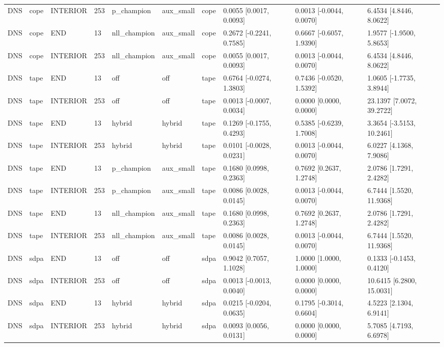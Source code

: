 \begin{tabular}{llllllllll}
DNS & cope & INTERIOR & 253 & p\_champion & aux\_small & cope & 0.0055 [0.0017, 0.0093] & 0.0013 [-0.0044, 0.0070] & 6.4534 [4.8446, 8.0622] \\
DNS & cope & END & 13 & nll\_champion & aux\_small & cope & 0.2672 [-0.2241, 0.7585] & 0.6667 [-0.6057, 1.9390] & 1.9577 [-1.9500, 5.8653] \\
DNS & cope & INTERIOR & 253 & nll\_champion & aux\_small & cope & 0.0055 [0.0017, 0.0093] & 0.0013 [-0.0044, 0.0070] & 6.4534 [4.8446, 8.0622] \\
DNS & tape & END & 13 & off & off & tape & 0.6764 [-0.0274, 1.3803] & 0.7436 [-0.0520, 1.5392] & 1.0605 [-1.7735, 3.8944] \\
DNS & tape & INTERIOR & 253 & off & off & tape & 0.0013 [-0.0007, 0.0034] & 0.0000 [0.0000, 0.0000] & 23.1397 [7.0072, 39.2722] \\
DNS & tape & END & 13 & hybrid & hybrid & tape & 0.1269 [-0.1755, 0.4293] & 0.5385 [-0.6239, 1.7008] & 3.3654 [-3.5153, 10.2461] \\
DNS & tape & INTERIOR & 253 & hybrid & hybrid & tape & 0.0101 [-0.0028, 0.0231] & 0.0013 [-0.0044, 0.0070] & 6.0227 [4.1368, 7.9086] \\
DNS & tape & END & 13 & p\_champion & aux\_small & tape & 0.1680 [0.0998, 0.2363] & 0.7692 [0.2637, 1.2748] & 2.0786 [1.7291, 2.4282] \\
DNS & tape & INTERIOR & 253 & p\_champion & aux\_small & tape & 0.0086 [0.0028, 0.0145] & 0.0013 [-0.0044, 0.0070] & 6.7444 [1.5520, 11.9368] \\
DNS & tape & END & 13 & nll\_champion & aux\_small & tape & 0.1680 [0.0998, 0.2363] & 0.7692 [0.2637, 1.2748] & 2.0786 [1.7291, 2.4282] \\
DNS & tape & INTERIOR & 253 & nll\_champion & aux\_small & tape & 0.0086 [0.0028, 0.0145] & 0.0013 [-0.0044, 0.0070] & 6.7444 [1.5520, 11.9368] \\
DNS & sdpa & END & 13 & off & off & sdpa & 0.9042 [0.7057, 1.1028] & 1.0000 [1.0000, 1.0000] & 0.1333 [-0.1453, 0.4120] \\
DNS & sdpa & INTERIOR & 253 & off & off & sdpa & 0.0013 [-0.0013, 0.0040] & 0.0000 [0.0000, 0.0000] & 10.6415 [6.2800, 15.0031] \\
DNS & sdpa & END & 13 & hybrid & hybrid & sdpa & 0.0215 [-0.0204, 0.0635] & 0.1795 [-0.3014, 0.6604] & 4.5223 [2.1304, 6.9141] \\
DNS & sdpa & INTERIOR & 253 & hybrid & hybrid & sdpa & 0.0093 [0.0056, 0.0131] & 0.0000 [0.0000, 0.0000] & 5.7085 [4.7193, 6.6978] \\

\end{tabular}
